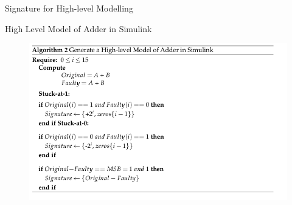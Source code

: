 \documentclass[aspectratio=1610]{beamer}
\begin{document}
\begin{frame}{Signature for High-level Modelling}

\begin{block}{High Level Model of Adder in Simulink}

\end{block}


\begin{figure}[tb!]
 \centering
  \captionsetup{justification=centering}    
   \includegraphics[scale=0.44]{Figures/algo-2.png}
   

\end{figure}



\end{frame}
\end{document}
